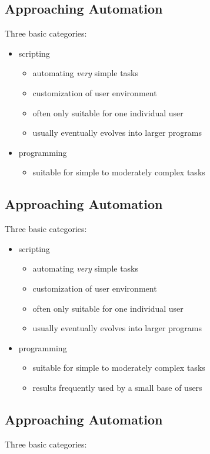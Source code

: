 \documentclass[xga]{xdvislides}
\begin{document}
\subsection{Approaching Automation}
Three basic categories:
\\
\begin{itemize}
	\item scripting
		\begin{itemize}
			\item automating {\em very} simple tasks
			\item customization of user environment
			\item often only suitable for one individual user
			\item usually eventually evolves into larger programs
		\end{itemize}
	\item programming
		\begin{itemize}
			\item suitable for simple to moderately complex tasks
		\end{itemize}
\end{itemize}

\subsection{Approaching Automation}
Three basic categories:
\\

\begin{itemize}
	\item scripting
		\begin{itemize}
			\item automating {\em very} simple tasks
			\item customization of user environment
			\item often only suitable for one individual user
			\item usually eventually evolves into larger programs
		\end{itemize}
	\item programming
		\begin{itemize}
			\item suitable for simple to moderately complex tasks
			\item results frequently used by a small base of users
		\end{itemize}
\end{itemize}

\subsection{Approaching Automation}
Three basic categories:
\\
\end{document}

